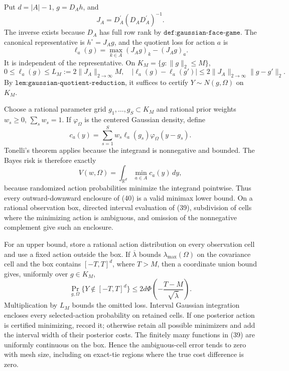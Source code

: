 Put \(d=|A|-1\), \(g=D_Ah\), and
\[
J_A=D_A^{\prime}(D_AD_A^{\prime})^{-1}.
\]
The inverse exists because \(D_A\) has full row rank by \(\texttt{def:gaussian-face-game}\).  The canonical representative is \(h^\circ=J_Ag\), and the quotient loss for action \(a\) is
\[
\ell_a(g)=\max_{k\in A}(J_Ag)_k-(J_Ag)_a. \tag{37}
\]
It is independent of the representative.  On \(K_M=\{g:\lVert g\rVert_2\leq M\}\),
\[
0\leq\ell_a(g)\leq L_M:=2\lVert J_A\rVert_{2\to\infty}M,
\quad
|\ell_a(g)-\ell_a(g')|
\leq2\lVert J_A\rVert_{2\to\infty}\lVert g-g'\rVert_2. \tag{38}
\]
By \(\texttt{lem:gaussian-quotient-reduction}\), it suffices to certify \(Y\sim N(g,\Omega)\) on \(K_M\).

Choose a rational parameter grid \(g_1,\ldots,g_S\subset K_M\) and rational prior weights \(w_s\geq0\), \(\sum_sw_s=1\).  If \(\varphi_\Omega\) is the centered Gaussian density, define
\[
c_a(y)=\sum_{s=1}^Sw_s\ell_a(g_s)\varphi_\Omega(y-g_s). \tag{39}
\]
Tonelli's theorem applies because the integrand is nonnegative and bounded.  The Bayes risk is therefore exactly
\[
V(w,\Omega)=\int_{\mathbb R^d}\min_{a\in A}c_a(y)\,dy, \tag{40}
\]
because randomized action probabilities minimize the integrand pointwise.  Thus every outward-downward enclosure of (40) is a valid minimax lower bound.  On a rational observation box, directed interval evaluation of (39), subdivision of cells where the minimizing action is ambiguous, and omission of the nonnegative complement give such an enclosure.

For an upper bound, store a rational action distribution on every observation cell and use a fixed action outside the box.  If \(\overline\lambda\) bounds \(\lambda_{\max}(\Omega)\) on the covariance cell and the box contains \([-T,T]^d\), where \(T>M\), then a coordinate union bound gives, uniformly over \(g\in K_M\),
\[
\Pr_{g,\Omega}\{Y\notin[-T,T]^d\}
\leq2d\Phi\!\left(-\frac{T-M}{\sqrt{\overline\lambda}}\right). \tag{41}
\]
Multiplication by \(L_M\) bounds the omitted loss.  Interval Gaussian integration encloses every selected-action probability on retained cells.  If one posterior action is certified minimizing, record it; otherwise retain all possible minimizers and add the interval width of their posterior costs.  The finitely many functions in (39) are uniformly continuous on the box.  Hence the ambiguous-cell error tends to zero with mesh size, including on exact-tie regions where the true cost difference is zero.

